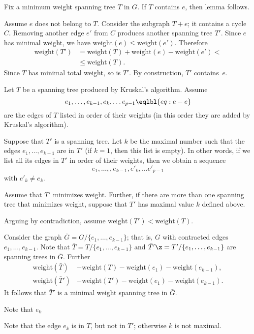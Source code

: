Fix a minimum weight spanning tree $T$ in $G$.
If $T$ contains $e$, then lemma follows.

Assume $e$ does not belong to $T$.
Consider the subgraph $T+e$; it contains a cycle $C$.
Removing another edge $e'$ from $C$ produces another spanning tree $T'$.
Since $e$ has minimal weight, we have $\mathrm{weight}(e)\le \mathrm{weight}(e')$.
Therefore
\begin{align*}
 \mathrm{weight}(T')&=\mathrm{weight}(T)+\mathrm{weight}(e)-\mathrm{weight}(e')<
 \\
 &\le\mathrm{weight}(T).
\end{align*}
Since $T$ has minimal total weight, so is $T'$.
By construction, $T'$ contains~$e$.
\qeds



Let $T$ be a spanning tree produced by Kruskal’s algorithm.
Assume 
\[e_1,\dots,e_{k-1},e_k,\dots e_{p-1}\eqlbl{eq:e-e}\] 
are the edges of $T$ listed in order of their weights
(in this order they are added by Kruskal’s algorithm).

Suppose that $T'$ is a spanning tree.
Let $k$ be the maximal number such that the edges  $e_1,\dots,e_{k-1}$ are in $T'$ (if $k=1$, then this list is empty). 
In other words, if we list all its edges in $T'$ in order of their weights, then 
we obtain a sequence 
\[e_1,\dots,,e_{k-1},e'_k,\dots e'_{p-1}\]
with $e'_k\ne e_k$.

Assume that $T'$ minimizes weight.
Further, if there are more than one spanning tree that minimizes weight, suppose that $T'$ has maximal value $k$ defined above.

Arguing by contradiction, assume $\mathrm{weight}(T')< \mathrm{weight}(T)$.

Consider the graph $\bar G=G/\{e_1,\dots,e_{k-1}\}$;
that is, $G$ with contracted edges $e_1,\dots,e_{k-1}$.
Note that $\bar T=T/\{e_1,\dots,e_{k-1}\}$ and $\bar T'\z=T'/\{e_1,\dots,e_{k-1}\}$ are spanning trees in $\bar G$.
Further 
\begin{align*}
\mathrm{weight}(\bar T)&+\mathrm{weight}(T)-\mathrm{weight}(e_1)-\mathrm{weight}(e_{k-1}),
\\
\mathrm{weight}(\bar T')&+\mathrm{weight}(T')-\mathrm{weight}(e_1)-\mathrm{weight}(e_{k-1}).
\end{align*}
It follows that 
$\bar T'$ is a minimal weight spanning tree in $\bar G$.

Note that $e_k$ 


Note that the edge $e_k$ is in $T$, but not in $T'$; otherwise $k$ is not maximal.

